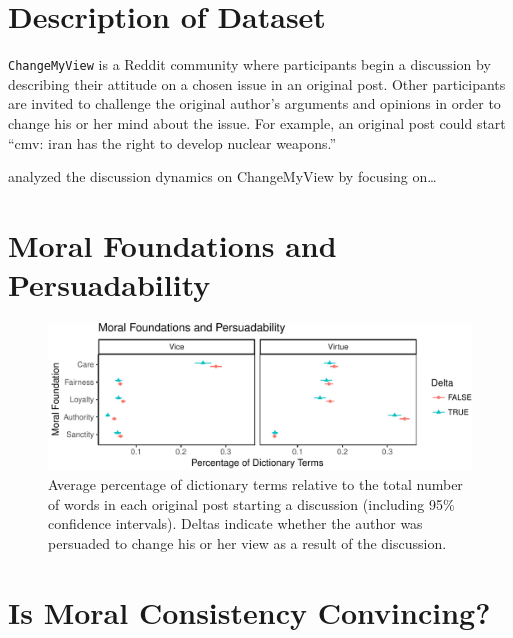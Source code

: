 \documentclass[12pt,]{article}
\begin{document}
\section{Description of Dataset}\label{description-of-dataset}

\texttt{ChangeMyView} is a Reddit community where participants begin a
discussion by describing their attitude on a chosen issue in an original
post. Other participants are invited to challenge the original author's
arguments and opinions in order to change his or her mind about the
issue. For example, an original post could start ``cmv: iran has the
right to develop nuclear weapons.''

\citet{tan2016winning} analyzed the discussion dynamics on ChangeMyView
by focusing on\ldots{}

\section{Moral Foundations and
Persuadability}\label{moral-foundations-and-persuadability}

\begin{figure}
\centering
\includegraphics{prelim_files/figure-latex/examine op data-1.pdf}
\caption{Average percentage of dictionary terms relative to the total
number of words in each original post starting a discussion (including
95\% confidence intervals). Deltas indicate whether the author was
persuaded to change his or her view as a result of the discussion.}
\end{figure}

\section{Is Moral Consistency
Convincing?}\label{is-moral-consistency-convincing}
\end{document}
